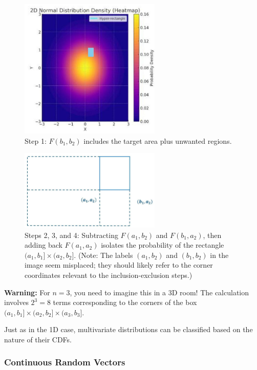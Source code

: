 \documentclass[11pt, a4paper]{article}
\theoremstyle{definition} %
\begin{document}
\begin{figure}[htbp]
    \centering
    \includegraphics[width=0.6\textwidth]{img-1.jpeg.jpeg}
    \caption{Step 1: $F(b_1, b_2)$ includes the target area plus unwanted regions.}
    \label{fig:2d_step1}
\end{figure}

\begin{figure}[htbp]
    \centering
    \includegraphics[width=0.6\textwidth]{img-2.jpeg.jpeg}
    \caption{Steps 2, 3, and 4: Subtracting $F(a_1, b_2)$ and $F(b_1, a_2)$, then adding back $F(a_1, a_2)$ isolates the probability of the rectangle $(a_1, b_1] \times (a_2, b_2]$. (Note: The labels $(a_1, b_2)$ and $(b_1, b_2)$ in the image seem misplaced; they should likely refer to the corner coordinates relevant to the inclusion-exclusion steps.)}
    \label{fig:2d_steps234}
\end{figure}

\textbf{Warning:} For $n=3$, you need to imagine this in a 3D room! The calculation involves $2^3=8$ terms corresponding to the corners of the box $(a_1, b_1] \times (a_2, b_2] \times (a_3, b_3]$.

Just as in the 1D case, multivariate distributions can be classified based on the nature of their CDFs.

\subsubsection*{Continuous Random Vectors}
\end{document}
